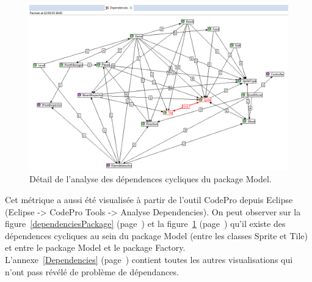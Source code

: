 \documentclass[12pt,a4paper,final]{article}
\newcommand{\annexe}[1]{annexe~\ref{#1} (page~\pageref{#1})}
\newcommand{\labelfigure}[1]{figure~\ref{#1} (page~\pageref{#1})}
\begin{document}
\begin{figure}[!h]
	\centering
	\includegraphics[width=\textwidth]{DependenciesModel.png}
	\caption{\label{dependenciesModel}Détail de l'analyse des dépendences cycliques du package Model.}
\end{figure}
Cet métrique a aussi été visualisée à partir de l'outil CodePro depuis Eclipse (Eclipse -> CodePro Tools -> Analyse Dependencies).
On peut observer sur la \labelfigure{dependenciesPackage} et la \labelfigure{dependenciesModel} qu'il existe des dépendences cycliques au sein du package Model (entre les classes Sprite et Tile) et entre le package Model et le package Factory.\\
L'\annexe{Dependencies} contient toutes les autres visualisations qui n'ont pass révélé de problème de dépendances.

\end{document}
